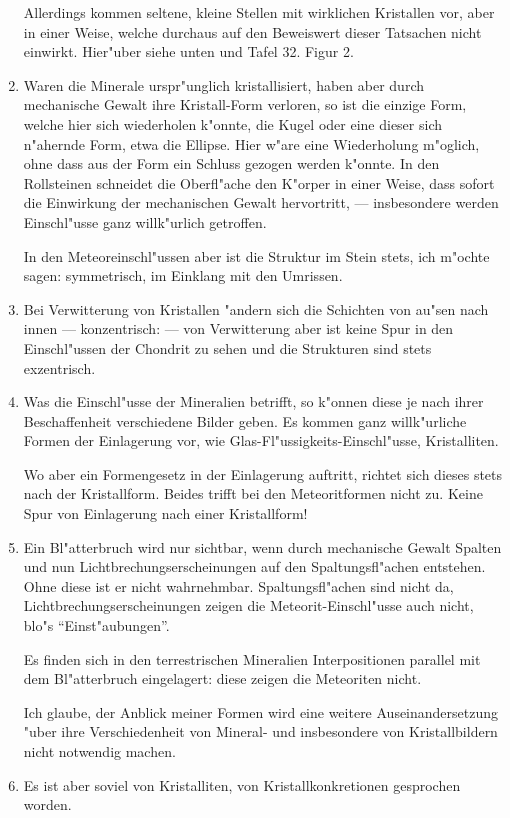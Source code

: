 \documentclass[a4paper, 11pt, oneside]{article}
\begin{document}
\begin{enumerate}
Allerdings kommen seltene, kleine Stellen mit wirklichen Kristallen vor, aber in einer Weise, welche durchaus auf den Beweiswert dieser Tatsachen nicht einwirkt. Hier"uber siehe unten und Tafel 32. Figur 2.
\item Waren die Minerale urspr"unglich kristallisiert, haben aber durch mechanische Gewalt ihre Kristall-Form verloren, so ist die einzige Form, welche hier sich wiederholen k"onnte, die Kugel oder eine dieser sich n"ahernde Form, etwa die Ellipse. Hier w"are eine Wiederholung m"oglich, ohne dass aus der Form ein Schluss gezogen werden k"onnte. In den Rollsteinen schneidet die Oberfl"ache den K"orper in einer Weise, dass sofort die Einwirkung der mechanischen Gewalt hervortritt, --- insbesondere werden Einschl"usse ganz willk"urlich getroffen.

In den Meteoreinschl"ussen aber ist die Struktur im Stein stets, ich m"ochte sagen: symmetrisch, im Einklang mit den Umrissen.
\item Bei Verwitterung von Kristallen "andern sich die Schichten von au"sen nach innen --- konzentrisch: --- von Verwitterung aber ist keine Spur in den Einschl"ussen der Chondrit zu sehen und die Strukturen sind stets exzentrisch.
\item Was die Einschl"usse der Mineralien betrifft, so k"onnen diese je nach ihrer Beschaffenheit verschiedene Bilder geben. Es kommen ganz willk"urliche Formen der Einlagerung vor, wie Glas-Fl"ussigkeits-Einschl"usse, Kristalliten.

Wo aber ein Formengesetz in der Einlagerung auftritt, richtet sich dieses stets nach der Kristallform. Beides trifft bei den Meteoritformen nicht zu. Keine Spur von Einlagerung nach einer Kristallform!
\item Ein Bl"atterbruch wird nur sichtbar, wenn durch mechanische Gewalt Spalten und nun Lichtbrechungserscheinungen auf den Spaltungsfl"achen entstehen. Ohne diese ist er nicht wahrnehmbar. Spaltungsfl"achen sind nicht da, Lichtbrechungserscheinungen zeigen die Meteorit-Einschl"usse auch nicht, blo"s "`Einst"aubungen"'.

Es finden sich in den terrestrischen Mineralien Interpositionen parallel mit dem Bl"atterbruch eingelagert: diese zeigen die Meteoriten nicht.

Ich glaube, der Anblick meiner Formen wird eine weitere Auseinandersetzung "uber ihre Verschiedenheit von Mineral- und insbesondere von Kristallbildern nicht notwendig machen.
\item Es ist aber soviel von Kristalliten, von Kristallkonkretionen gesprochen worden.


\end{enumerate}
\end{document}
